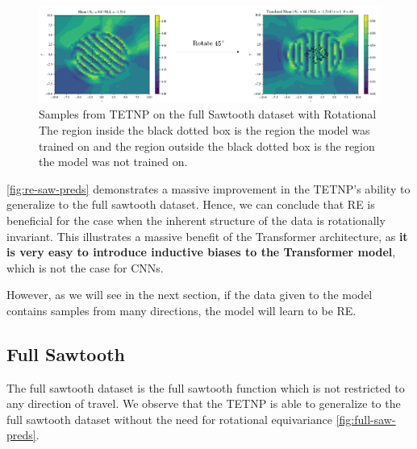 \documentclass[../../main.tex]{subfiles}
\begin{document}

\begin{figure}[H]
    \centering
    \includegraphics[width=1\linewidth]{./fig/res-saw/re.png}
    \caption{Samples from TETNP on the full Sawtooth dataset with Rotational 
    The region inside the black dotted box is the region the model was trained on and the region outside the black dotted box is the region the model was not trained on.}
    \label{fig:re-saw-preds}
\end{figure}

\autoref{fig:re-saw-preds} demonstrates a massive improvement in the TETNP's ability to generalize to the full sawtooth dataset. Hence, we can conclude that RE is beneficial for the case when the inherent structure of the data is rotationally invariant. This illustrates a massive benefit of the Transformer architecture, as \textbf{it is very easy to introduce inductive biases to the Transformer model}, which is not the case for CNNs.

However, as we will see in the next section, if the data given to the model contains samples from many directions, the model will learn to be RE.

\subsection{Full Sawtooth}

The full sawtooth dataset is the full sawtooth function which is not restricted to any direction of travel. We observe that the TETNP is able to generalize to the full sawtooth dataset without the need for rotational equivariance \autoref{fig:full-saw-preds}. 

\end{document}
